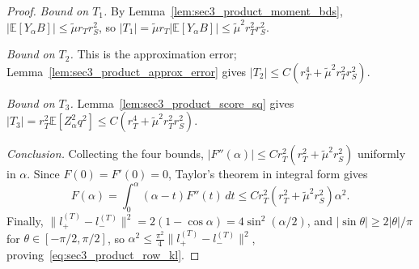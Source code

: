 \documentclass[10pt,a4paper]{amsart}
\newcommand{\Ebb}{\mathbb E}
\newcommand{\trg}{T}
\begin{document}
\begin{proof}
\textit{Bound on $T_1$.}
By Lemma~\ref{lem:sec3_product_moment_bds}, $|\Ebb[Y_\alpha B]|\le\tilde\mu r_T r_S^2$,
so $|T_1|=\tilde\mu r_T|\Ebb[Y_\alpha B]|\le\tilde\mu^2 r_T^2 r_S^2$.

\textit{Bound on $T_2$.}
This is the approximation error; Lemma~\ref{lem:sec3_product_approx_error} gives
$|T_2|\le C(r_T^4+\tilde\mu^2 r_T^2 r_S^2)$.

\textit{Bound on $T_3$.}
Lemma~\ref{lem:sec3_product_score_sq} gives
$|T_3|=r_T^2\Ebb[Z_\alpha^2 q^2]\le C(r_T^4+\tilde\mu^2 r_T^2 r_S^2)$.

\textit{Conclusion.}
Collecting the four bounds,
$|F''(\alpha)|\le Cr_T^2(r_T^2+\tilde\mu^2 r_S^2)$ uniformly in $\alpha$.
Since $F(0)=F'(0)=0$, Taylor's theorem in integral form gives
\[
    F(\alpha) = \int_0^\alpha(\alpha-t)F''(t)\,dt
    \le Cr_T^2(r_T^2+\tilde\mu^2 r_S^2)\alpha^2.
\]
Finally, $\|l^{(\trg)}_+-l^{(\trg)}_-\|^2=2(1-\cos\alpha)=4\sin^2(\alpha/2)$,
and $|\sin\theta|\ge 2|\theta|/\pi$ for $\theta\in[-\pi/2,\pi/2]$, so
$\alpha^2\le\frac{\pi^2}{4}\|l^{(\trg)}_+-l^{(\trg)}_-\|^2$,
proving~\eqref{eq:sec3_product_row_kl}.
\end{proof}
\end{document}
